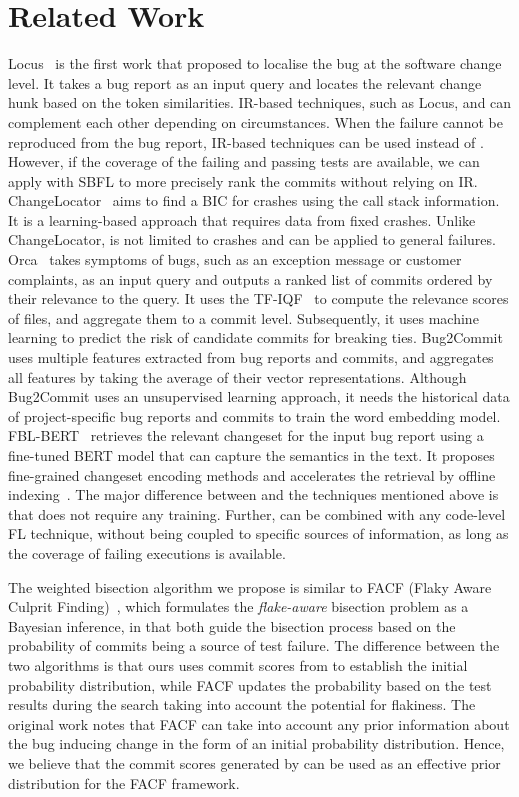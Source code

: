 \section{Related Work}
\label{sec:related_work}

Locus~\cite{Wen2016} is the first work that proposed to localise the bug at the
software change level. It takes a bug report as an input query and locates the
relevant change hunk based on the token similarities. IR-based techniques, such
as Locus, and \name can complement each other depending on circumstances. When
the failure cannot be reproduced from the bug report, IR-based techniques can
be used instead of \name. However, if the coverage of the failing and passing
tests are available, we can apply \name with SBFL to more precisely rank the
commits without relying on IR.
ChangeLocator~\cite{Wu2017} aims to find a BIC for crashes using the call stack
information. It is a learning-based approach that requires data from fixed
crashes. Unlike ChangeLocator, \name is not limited to crashes and can be
applied to general failures. Orca~\cite{Bhagwan2018} takes symptoms of bugs,
such as an exception message or customer complaints, as an input query and
outputs a ranked list of commits ordered by their relevance to the query. It
uses the TF-IQF~\cite{Yang2008} to compute the relevance scores of files, and
aggregate them to a commit level. Subsequently, it uses machine learning to
predict the risk of candidate commits for breaking ties.
Bug2Commit~\cite{Murali2021} uses multiple features extracted from bug reports
and commits, and aggregates all features by taking the average of their vector
representations. Although Bug2Commit uses an unsupervised learning approach, it
needs the historical data of project-specific bug reports and commits to train
the word embedding model. FBL-BERT~\cite{Ciborowska2022} retrieves the relevant
changeset for the input bug report using a fine-tuned BERT model that can
capture the semantics in the text. It proposes fine-grained changeset encoding methods and accelerates the retrieval by offline indexing~\cite{johnson2019billion}. The major difference between \name and the techniques
mentioned above is that \name does not require any training. Further, \name can
be combined with any code-level FL technique, without being coupled to
specific sources of information, as long as the coverage of failing executions
is available.

The weighted bisection algorithm we propose is similar to FACF (Flaky Aware Culprit Finding)~\cite{Henderson2023}, which formulates the \emph{flake-aware} bisection problem as a Bayesian inference, in that both guide the bisection process based on the probability of commits being a source of test failure. The difference between the two algorithms is that ours uses commit scores from \name to establish the initial probability distribution, while  FACF updates the probability based on the test results during the search taking into account the potential for flakiness. The original work notes that FACF can take into account any prior information about the bug inducing change in the form of an initial probability distribution. Hence, we believe that the commit scores generated by \name can be used as an effective prior distribution for the FACF framework.

